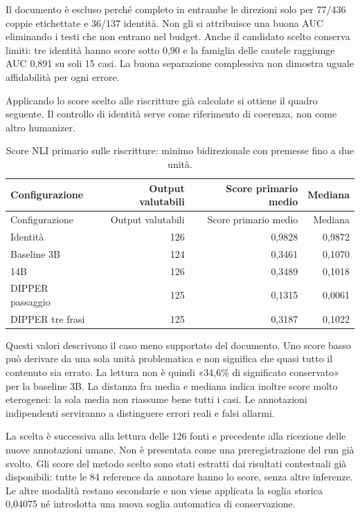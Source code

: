 Il documento è escluso perché completo in entrambe le direzioni solo per 77/436 coppie etichettate e 36/137 identità. Non gli si attribuisce una buona AUC eliminando i testi che non entrano nel budget. Anche il candidato scelto conserva limiti: tre identità hanno score sotto 0,90 e la famiglia delle cautele raggiunge AUC 0,891 su soli 15 casi. La buona separazione complessiva non dimostra uguale affidabilità per ogni errore.

Applicando lo score scelto alle riscritture già calcolate si ottiene il quadro seguente. Il controllo di identità serve come riferimento di coerenza, non come altro humanizer.

\begingroup\small\setlength{\tabcolsep}{3pt}
\begin{longtable}[]{@{}lrrr@{}}
\caption{Score NLI primario sulle riscritture: minimo bidirezionale con premesse fino a due unità.}\tabularnewline
\toprule\noalign{}
Configurazione & Output valutabili & Score primario medio & Mediana \\
\midrule\noalign{}
\endfirsthead
\toprule\noalign{}
Configurazione & Output valutabili & Score primario medio & Mediana \\
\midrule\noalign{}
\endhead
\bottomrule\noalign{}
\endlastfoot
Identità & 126 & 0,9828 & 0,9872 \\
Baseline 3B & 124 & 0,3461 & 0,1070 \\
14B & 126 & 0,3489 & 0,1018 \\
DIPPER passaggio & 125 & 0,1315 & 0,0061 \\
DIPPER tre frasi & 125 & 0,3187 & 0,1022 \\
\end{longtable}
\endgroup

Questi valori descrivono il caso meno supportato del documento. Uno score basso può derivare da una sola unità problematica e non significa che quasi tutto il contenuto sia errato. La lettura non è quindi «34,6\% di significato conservato» per la baseline 3B. La distanza fra media e mediana indica inoltre score molto eterogenei: la sola media non riassume bene tutti i casi. Le annotazioni indipendenti serviranno a distinguere errori reali e falsi allarmi.

La scelta è successiva alla lettura delle 126 fonti e precedente alla ricezione delle nuove annotazioni umane. Non è presentata come una preregistrazione del run già svolto. Gli score del metodo scelto sono stati estratti dai risultati contestuali già disponibili: tutte le 84 reference da annotare hanno lo score, senza altre inferenze. Le altre modalità restano secondarie e non viene applicata la soglia storica 0,04075 né introdotta una nuova soglia automatica di conservazione.

